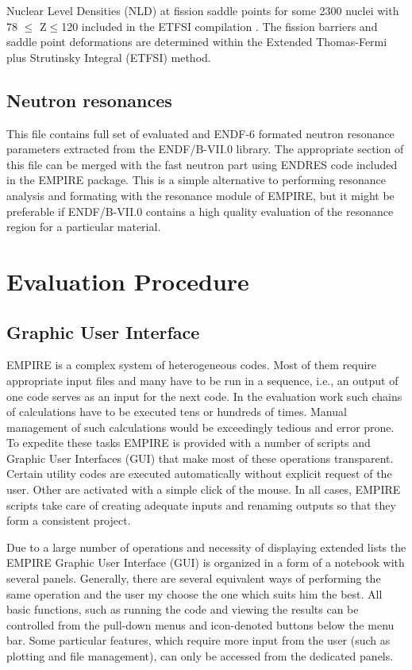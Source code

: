 Nuclear Level Densities (NLD) at fission saddle points for some 2300 nuclei
with 78 $\le$ Z$\le$120 included in the ETFSI compilation \cite%
{Mamdouh(2001)}. The fission barriers and saddle point deformations are
determined within the Extended Thomas-Fermi plus Strutinsky Integral (ETFSI)
method.

\subsection{Neutron resonances}

This file contains full set of evaluated and ENDF-6 formated neutron
resonance parameters extracted from the ENDF/B-VII.0 library. The
appropriate section of this file can be merged with the fast neutron part
using ENDRES code included in the EMPIRE package. This is a simple
alternative to performing resonance analysis and formating with the
resonance module of EMPIRE, but it might be preferable if ENDF/B-VII.0
contains a high quality evaluation of the resonance region for a particular
material.


\section{Evaluation Procedure}

\subsection{Graphic User Interface}

EMPIRE is a complex system of heterogeneous codes. Most of them require
appropriate input files and many have to be run in a sequence, i.e., an
output of one code serves as an input for the next code. In the evaluation
work such chains of calculations have to be executed tens or hundreds of
times. Manual management of such calculations would be exceedingly tedious
and error prone. To expedite these tasks EMPIRE is provided with a number of
scripts and Graphic User Interfaces (GUI) that make most of these operations
transparent. Certain utility codes are executed automatically without
explicit request of the user. Other are activated with a simple click of the
mouse. In all cases, EMPIRE scripts take care of creating adequate inputs
and renaming outputs so that they form a consistent project.

Due to a large number of operations and necessity of displaying extended
lists the EMPIRE Graphic User Interface (GUI) is organized in a form of a
notebook with several panels. Generally, there are several equivalent ways
of performing the same operation and the user my choose the one which suits
him the best. All basic functions, such as running the code and viewing the
results can be controlled from the pull-down menus and icon-denoted buttons
below the menu bar. Some particular features, which require more input from
the user (such as plotting and file management), can only be accessed from
the dedicated panels.

